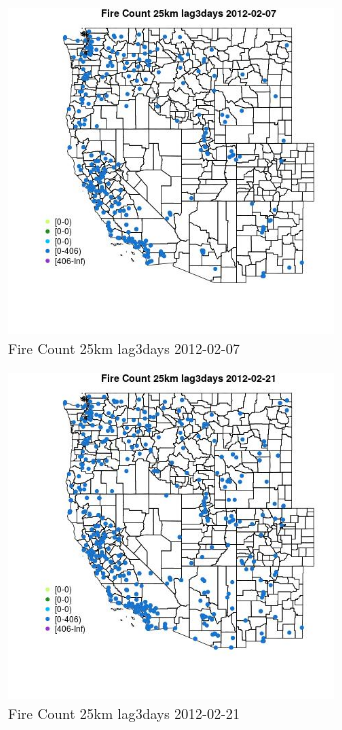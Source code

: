 \begin{figure} 
\centering  
\includegraphics[width=0.77\textwidth]{Code_Outputs/Report_ML_input_PM25_Step4_part_f_de_duplicated_aves_prioritize_24hr_obswNAs_MapObsFire_Count_25km_lag3days2012-02-07.jpg} 
\caption{\label{fig:Report_ML_input_PM25_Step4_part_f_de_duplicated_aves_prioritize_24hr_obswNAsMapObsFire_Count_25km_lag3days2012-02-07}Fire Count 25km lag3days 2012-02-07} 
\end{figure} 
 

\clearpage 

\begin{figure} 
\centering  
\includegraphics[width=0.77\textwidth]{Code_Outputs/Report_ML_input_PM25_Step4_part_f_de_duplicated_aves_prioritize_24hr_obswNAs_MapObsFire_Count_25km_lag3days2012-02-21.jpg} 
\caption{\label{fig:Report_ML_input_PM25_Step4_part_f_de_duplicated_aves_prioritize_24hr_obswNAsMapObsFire_Count_25km_lag3days2012-02-21}Fire Count 25km lag3days 2012-02-21} 
\end{figure} 
 

